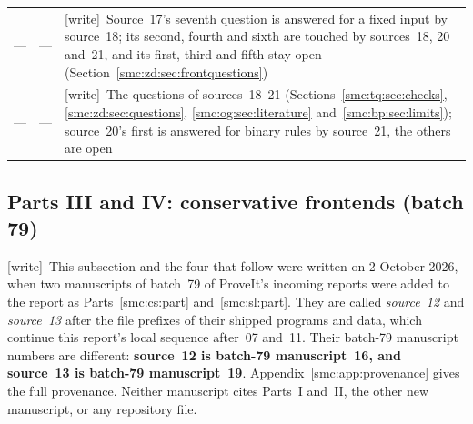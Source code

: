 \documentclass[11pt,letterpaper]{article}
\numberwithin{equation}{section}
\theoremstyle{definition}
\theoremstyle{remark}
\newcommand{\wtag}{\textup{[write]}}
\begin{document}
\begin{center}
\begin{longtable}{@{}L{0.3\textwidth}L{0.3\textwidth}L{0.32\textwidth}@{}}
--- & --- & \wtag\ Source~17's seventh question is answered for a fixed input by source~18; its second, fourth and sixth are touched by sources~18, 20 and~21, and its first, third and fifth stay open (Section~\ref{smc:zd:sec:frontquestions})\\
--- & --- & \wtag\ The questions of sources~18--21 (Sections~\ref{smc:tq:sec:checks}, \ref{smc:zd:sec:questions}, \ref{smc:og:sec:literature} and~\ref{smc:bp:sec:limits}); source~20's first is answered for binary rules by source~21, the others are open\\
\bottomrule
\end{longtable}
\end{center}

\subsection{Parts III and IV: conservative frontends (batch 79)}\label{smc:cs:sec:batch79}

\wtag\ This subsection and the four that follow were written on 2 October 2026, when two manuscripts of batch~79 of ProveIt's incoming reports were added to the report as Parts~\ref{smc:cs:part} and~\ref{smc:sl:part}. They are called \emph{source~12} and \emph{source~13} after the file prefixes of their shipped programs and data, which continue this report's local sequence after~07 and~11. Their batch-79 manuscript numbers are different: \textbf{source~12 is batch-79 manuscript~16, and source~13 is batch-79 manuscript~19}. Appendix~\ref{smc:app:provenance} gives the full provenance. Neither manuscript cites Parts~I and~II, the other new manuscript, or any repository file.
\end{document}
